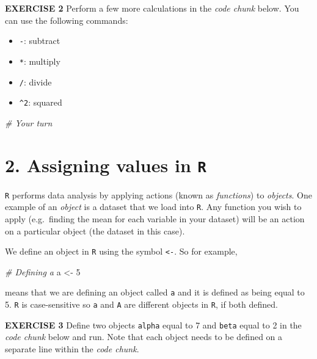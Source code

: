 \documentclass[
]{article}
\newenvironment{Shaded}{\begin{snugshade}}{\end{snugshade}}
\newcommand{\CommentTok}[1]{\textcolor[rgb]{0.56,0.35,0.01}{\textit{#1}}}
\newcommand{\DecValTok}[1]{\textcolor[rgb]{0.00,0.00,0.81}{#1}}
\newcommand{\NormalTok}[1]{#1}
\newcommand{\StringTok}[1]{\textcolor[rgb]{0.31,0.60,0.02}{#1}}
\providecommand{\tightlist}{%
  \setlength{\itemsep}{0pt}\setlength{\parskip}{0pt}}
\begin{document}
\textbf{EXERCISE 2} Perform a few more calculations in the \emph{code
chunk} below. You can use the following commands:

\begin{itemize}
\tightlist
\item
  \texttt{-}: subtract
\item
  \texttt{*}: multiply
\item
  \texttt{/}: divide
\item
  \texttt{\^{}2}: squared
\end{itemize}

\begin{Shaded}
\begin{Highlighting}[]
\CommentTok{# Your turn}
\end{Highlighting}
\end{Shaded}

\hypertarget{assigning-values-in-r}{%
\section{\texorpdfstring{2. Assigning values in
\texttt{R}}{2. Assigning values in R}}\label{assigning-values-in-r}}

\texttt{R} performs data analysis by applying actions (known as
\emph{functions}) to \emph{objects}. One example of an \emph{object} is
a dataset that we load into \texttt{R}. Any function you wish to apply
(e.g.~finding the mean for each variable in your dataset) will be an
action on a particular object (the dataset in this case).

We define an object in \texttt{R} using the symbol
\texttt{\textless{}-}. So for example,

\begin{Shaded}
\begin{Highlighting}[]
\CommentTok{# Defining a}
\NormalTok{a <-}\StringTok{ }\DecValTok{5}
\end{Highlighting}
\end{Shaded}

means that we are defining an object called \texttt{a} and it is defined
as being equal to 5. \texttt{R} is case-sensitive so \texttt{a} and
\texttt{A} are different objects in \texttt{R}, if both defined.

\textbf{EXERCISE 3} Define two objects \texttt{alpha} equal to 7 and
\texttt{beta} equal to 2 in the \emph{code chunk} below and run. Note
that each object needs to be defined on a separate line within the
\emph{code chunk}.
\end{document}
